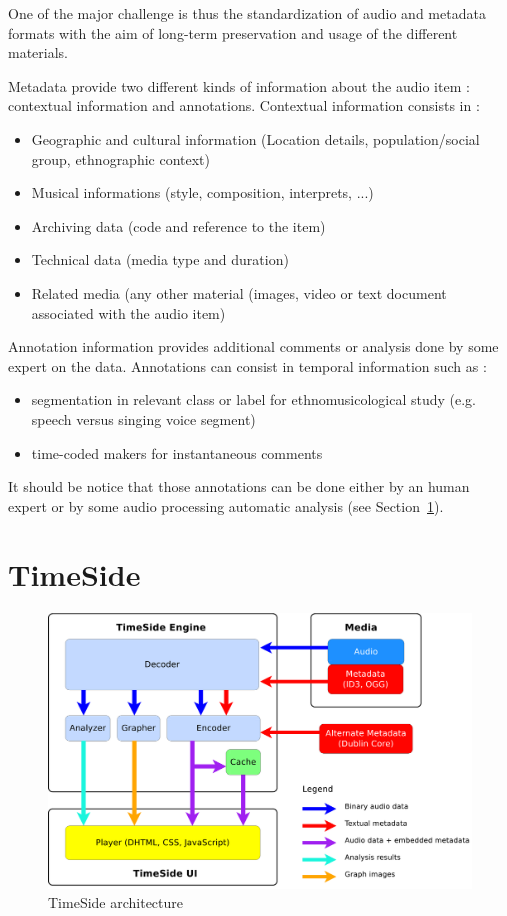 \documentclass[runningheads,a4paper]{llncs}
\begin{document}
One of the major challenge is thus the standardization of audio and metadata formats with the aim of long-term preservation and usage of the different materials. 

Metadata provide two different kinds of information about the audio item : contextual information and annotations.
Contextual information consists in :
\begin{itemize}
\item Geographic and cultural information  (Location details, population/social group, ethnographic context)
\item Musical informations (style, composition, interprets, ...)
\item Archiving data (code and reference to the item)
\item Technical data (media type and duration)
\item Related media (any other material (images, video or text document associated with the audio item)
\end{itemize}

Annotation information provides additional comments or analysis done by some expert on the data. Annotations can consist in temporal information such as :
\begin{itemize}
\item segmentation in relevant class or label for ethnomusicological study (e.g. speech versus singing voice segment)
\item time-coded makers for instantaneous comments 
\end{itemize}
It should be notice that those annotations can be done either by an human expert or by some audio processing automatic analysis (see Section~\ref{sec:Timeside}).



\section{TimeSide}\label{sec:Timeside}

\begin{figure}[htbp]
  \centering
  \includegraphics[width=12cm]{img/timeside_schema.pdf}
  \caption{TimeSide architecture}
\end{figure}
\end{document}
